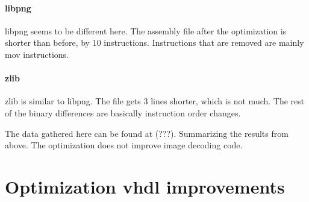 \paragraph{libpng} libpng seems to be different here. The assembly file after the optimization is shorter than before, by 10 instructions. Instructions that are removed are mainly mov instructions.

\paragraph{zlib} zlib is similar to libpng. The file gets 3 lines shorter, which is not much. The rest of the binary differences are basically instruction order changes.

The data gathered here can be found at (???).
Summarizing the results from above. The optimization does not improve image decoding code. 

\section{Optimization vhdl improvements}
%